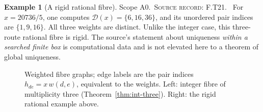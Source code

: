 \documentclass[11pt,oneside,openany]{book}
\theoremstyle{definition}
\newtheorem{example}[theorem]{Example}
\theoremstyle{remark}
\newcommand{\Dx}{\mathcal{D}}
\newcommand{\scope}[1]{\textsf{\small Scope #1.}\ }
\newcommand{\record}[1]{\textup{\textsc{Source record: #1.}}\ }
\begin{document}
\begin{example}[A rigid rational fibre]\label{ex:rigid}
\scope{A0}\record{F.T21} For \(x=20736/5\), one computes \(\Dx(x)=\{6,16,36\}\), and its unordered pair indices are \(\{1,9,16\}\). All three weights are distinct. Unlike the integer case, this three-route rational fibre is rigid. The source's statement about uniqueness \emph{within a searched finite box} is computational data and is not elevated here to a theorem of global uniqueness.
\end{example}
\begin{figure}[t]
\centering
{}
\caption{Weighted fibre graphs; edge labels are the pair indices $h_{de}=x\,w(d,e)$, equivalent to the weights. Left: integer fibre of multiplicity three (Theorem~\ref{thm:int-three}). Right: the rigid rational example above.}\label{fig:triangles}
\end{figure}
\end{document}
